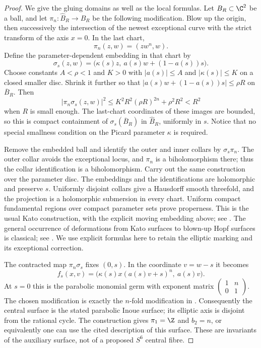 \begin{proof}
We give the gluing domains as well as the local formulas. Let
$B_R\subset\C^2$ be a ball, and let
$\pi_n:\widehat B_R\to B_R$ be the following modification.
Blow up the origin, then successively the intersection of the newest
exceptional curve with the strict transform of the axis $x=0$.
In the last chart,
\[
 \pi_n(z,w)=(zw^n,w).
\]
Define the parameter-dependent embedding in that chart by
\[
 \sigma_s(z,w)=
       \bigl(\kappa(s)z,\ a(s)w+(1-a(s))s\bigr).
\]
Choose constants $A<\rho<1$ and $K>0$ with
$|a(s)|\le A$ and $|\kappa(s)|\le K$ on a closed smaller disc.
Shrink it further so that
$|a(s)w+(1-a(s))s|\le\rho R$ on $\overline B_R$.
Then
\[
 |\pi_n\sigma_s(z,w)|^2
 \le K^2R^2(\rho R)^{2n}+\rho^2R^2<R^2
\]
when $R$ is small enough. The last-chart coordinates of these images
are bounded, so this is compact containment of
$\sigma_s(\overline B_R)$ in $\widehat B_R$, uniformly in $s$.
Notice that no special smallness condition on the Picard parameter
$\kappa$ is required.

Remove the embedded ball and identify the outer and inner collars by
$\sigma_s\pi_n$. The outer collar avoids the exceptional locus, and
$\pi_n$ is a biholomorphism there; thus the collar identification is
a biholomorphism. Carry out the same construction over the parameter
disc. The embeddings and the identifications are holomorphic and
preserve $s$. Uniformly disjoint collars give a Hausdorff smooth
threefold, and the projection is a holomorphic submersion in every
chart. Uniform compact fundamental regions over compact parameter
sets prove properness. This is the usual Kato construction, with
the explicit moving embedding above; see
\citet[Section 2, pp.1351--1353]{IstratiEtAl2022Root}.
The general occurrence of deformations from Kato surfaces to
blown-up Hopf surfaces is classical; see
\citet[Introduction, pp.1750--1751]{Teleman2010AB}.
We use explicit formulas here to retain the elliptic marking and
its exceptional correction.

The contracted map $\pi_n\sigma_s$ fixes $(0,s)$.
In the coordinate $v=w-s$ it becomes
\[
 f_s(x,v)=
    \bigl(\kappa(s)x(a(s)v+s)^n,\ a(s)v\bigr).
\]
At $s=0$ this is the parabolic monomial germ with exponent matrix
$\left(\begin{smallmatrix}1&n\\0&1\end{smallmatrix}\right)$.
The chosen modification is exactly the $n$-fold modification in
\citet[Example 9.10, p.1386]{IstratiEtAl2022Root}.
Consequently the central surface is the stated parabolic Inoue
surface; its elliptic axis is disjoint from the rational cycle.
The construction gives $\pi_1=\Z$ and $b_2=n$, or equivalently one
can use the cited description of this surface. These are invariants
of the auxiliary surface, not of a proposed $S^6$ central fibre.


\end{proof}
